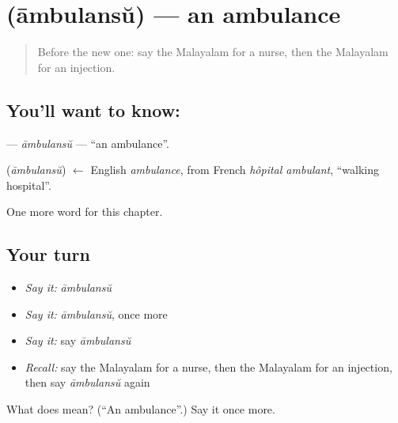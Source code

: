 \section[\texorpdfstring{\ml{ആംബുലൻസ്} (āmbulansŭ)}{ആംബുലൻസ് (āmbulansŭ)}]{ (āmbulansŭ) — an ambulance}

\label{lesson:ML-C312-ambulansu}



\begin{quote}
Before the new one: say the Malayalam for a nurse, then the Malayalam for an injection.
\end{quote}

\subsection*{You'll want to know: }
\textbf{} — \emph{āmbulansŭ} — \textquotedblleft{}an ambulance\textquotedblright{}.

\begin{cousinweb}
\textbf{} (\emph{āmbulansŭ}) $\leftarrow$ English \emph{ambulance}, from French \emph{hôpital ambulant}, \textquotedblleft{}walking hospital\textquotedblright{}.
\end{cousinweb}

\begin{grammarlens}[title={What you've built}]
One more word for this chapter.
\end{grammarlens}

\subsection*{Your turn}
\begin{itemize}
\raggedright
  \item \emph{Say it:} \emph{āmbulansŭ}
  \item \emph{Say it:} \emph{āmbulansŭ}, once more
  \item \emph{Say it:} say \emph{āmbulansŭ}
  \item \emph{Recall:} say the Malayalam for a nurse, then the Malayalam for an injection, then say \emph{āmbulansŭ} again
\end{itemize}

\begin{tcolorbox}[breakable,colback=teal!4,colframe=teal!35!black,title={Before you move on}]
What does  mean? (\textquotedblleft{}An ambulance\textquotedblright{}.) Say it once more.
\end{tcolorbox}
